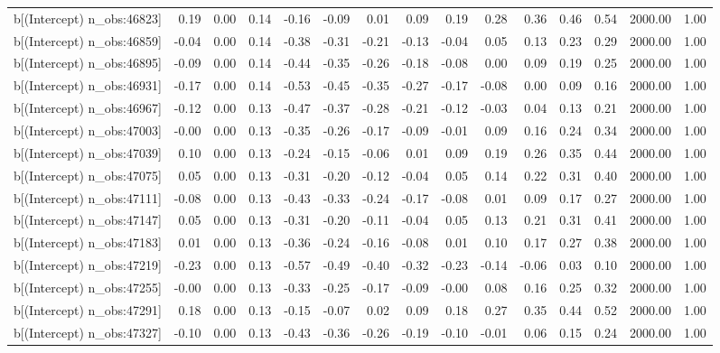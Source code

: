\begin{table}[ht]
\begin{tabular}{rrrrrrrrrrrrrrr}
  b[(Intercept) n\_obs:46823] & 0.19 & 0.00 & 0.14 & -0.16 & -0.09 & 0.01 & 0.09 & 0.19 & 0.28 & 0.36 & 0.46 & 0.54 & 2000.00 & 1.00 \\ 
  b[(Intercept) n\_obs:46859] & -0.04 & 0.00 & 0.14 & -0.38 & -0.31 & -0.21 & -0.13 & -0.04 & 0.05 & 0.13 & 0.23 & 0.29 & 2000.00 & 1.00 \\ 
  b[(Intercept) n\_obs:46895] & -0.09 & 0.00 & 0.14 & -0.44 & -0.35 & -0.26 & -0.18 & -0.08 & 0.00 & 0.09 & 0.19 & 0.25 & 2000.00 & 1.00 \\ 
  b[(Intercept) n\_obs:46931] & -0.17 & 0.00 & 0.14 & -0.53 & -0.45 & -0.35 & -0.27 & -0.17 & -0.08 & 0.00 & 0.09 & 0.16 & 2000.00 & 1.00 \\ 
  b[(Intercept) n\_obs:46967] & -0.12 & 0.00 & 0.13 & -0.47 & -0.37 & -0.28 & -0.21 & -0.12 & -0.03 & 0.04 & 0.13 & 0.21 & 2000.00 & 1.00 \\ 
  b[(Intercept) n\_obs:47003] & -0.00 & 0.00 & 0.13 & -0.35 & -0.26 & -0.17 & -0.09 & -0.01 & 0.09 & 0.16 & 0.24 & 0.34 & 2000.00 & 1.00 \\ 
  b[(Intercept) n\_obs:47039] & 0.10 & 0.00 & 0.13 & -0.24 & -0.15 & -0.06 & 0.01 & 0.09 & 0.19 & 0.26 & 0.35 & 0.44 & 2000.00 & 1.00 \\ 
  b[(Intercept) n\_obs:47075] & 0.05 & 0.00 & 0.13 & -0.31 & -0.20 & -0.12 & -0.04 & 0.05 & 0.14 & 0.22 & 0.31 & 0.40 & 2000.00 & 1.00 \\ 
  b[(Intercept) n\_obs:47111] & -0.08 & 0.00 & 0.13 & -0.43 & -0.33 & -0.24 & -0.17 & -0.08 & 0.01 & 0.09 & 0.17 & 0.27 & 2000.00 & 1.00 \\ 
  b[(Intercept) n\_obs:47147] & 0.05 & 0.00 & 0.13 & -0.31 & -0.20 & -0.11 & -0.04 & 0.05 & 0.13 & 0.21 & 0.31 & 0.41 & 2000.00 & 1.00 \\ 
  b[(Intercept) n\_obs:47183] & 0.01 & 0.00 & 0.13 & -0.36 & -0.24 & -0.16 & -0.08 & 0.01 & 0.10 & 0.17 & 0.27 & 0.38 & 2000.00 & 1.00 \\ 
  b[(Intercept) n\_obs:47219] & -0.23 & 0.00 & 0.13 & -0.57 & -0.49 & -0.40 & -0.32 & -0.23 & -0.14 & -0.06 & 0.03 & 0.10 & 2000.00 & 1.00 \\ 
  b[(Intercept) n\_obs:47255] & -0.00 & 0.00 & 0.13 & -0.33 & -0.25 & -0.17 & -0.09 & -0.00 & 0.08 & 0.16 & 0.25 & 0.32 & 2000.00 & 1.00 \\ 
  b[(Intercept) n\_obs:47291] & 0.18 & 0.00 & 0.13 & -0.15 & -0.07 & 0.02 & 0.09 & 0.18 & 0.27 & 0.35 & 0.44 & 0.52 & 2000.00 & 1.00 \\ 
  b[(Intercept) n\_obs:47327] & -0.10 & 0.00 & 0.13 & -0.43 & -0.36 & -0.26 & -0.19 & -0.10 & -0.01 & 0.06 & 0.15 & 0.24 & 2000.00 & 1.00 \\ 

\end{tabular}
\end{table}

